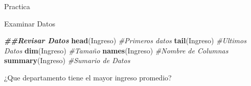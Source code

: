 \documentclass[
  ignorenonframetext,
]{beamer}
\newenvironment{Shaded}{\begin{snugshade}}{\end{snugshade}}
\newcommand{\CommentTok}[1]{\textcolor[rgb]{0.56,0.35,0.01}{\textit{#1}}}
\newcommand{\DocumentationTok}[1]{\textcolor[rgb]{0.56,0.35,0.01}{\textbf{\textit{#1}}}}
\newcommand{\FunctionTok}[1]{\textcolor[rgb]{0.13,0.29,0.53}{\textbf{#1}}}
\newcommand{\NormalTok}[1]{#1}
\begin{document}
\begin{frame}[fragile]{Practica}
\begin{block}{Examinar Datos}
\protect\hypertarget{examinar-datos}{}
\begin{Shaded}
\begin{Highlighting}[]
\DocumentationTok{\#\#Revisar Datos}
\FunctionTok{head}\NormalTok{(Ingreso) }\CommentTok{\#Primeros datos}
\FunctionTok{tail}\NormalTok{(Ingreso) }\CommentTok{\#Ultimos Datos}
\FunctionTok{dim}\NormalTok{(Ingreso) }\CommentTok{\#Tamaño }
\FunctionTok{names}\NormalTok{(Ingreso) }\CommentTok{\#Nombre de Columnas}
\FunctionTok{summary}\NormalTok{(Ingreso) }\CommentTok{\#Sumario de Datos }
\end{Highlighting}
\end{Shaded}
\end{block}
\end{frame}

\begin{frame}{¿Que departamento tiene el mayor ingreso promedio?}
\protect\hypertarget{que-departamento-tiene-el-mayor-ingreso-promedio}{}
\end{frame}
\end{document}
